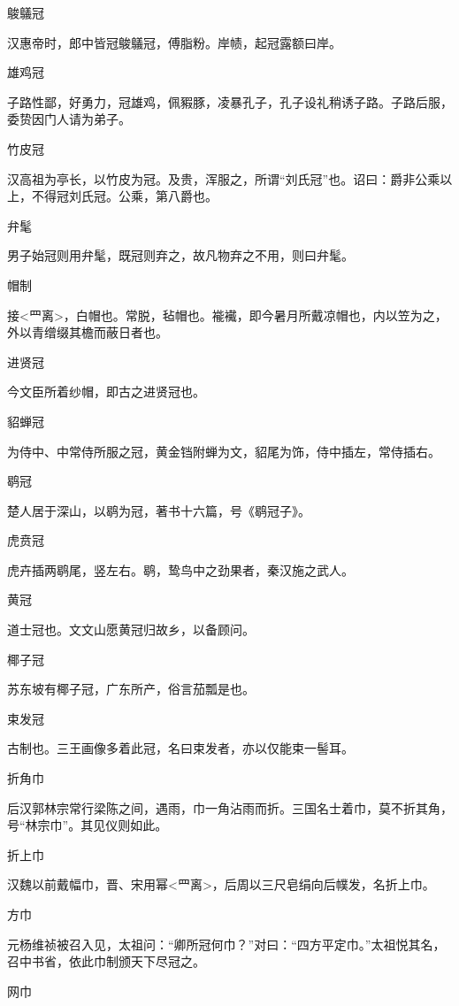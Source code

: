 \documentclass[a4paper,12pt,UTF8,twoside]{ctexbook}
\begin{document}
    鵔鸃冠
    
    汉惠帝时，郎中皆冠鵔鸃冠，傅脂粉。岸帻，起冠露额曰岸。
    
    雄鸡冠
    
    子路性鄙，好勇力，冠雄鸡，佩豭豚，凌暴孔子，孔子设礼稍诱子路。子路后服，委贽因门人请为弟子。
    
    竹皮冠
    
    汉高祖为亭长，以竹皮为冠。及贵，浑服之，所谓“刘氏冠”也。诏曰：爵非公乘以上，不得冠刘氏冠。公乘，第八爵也。
    
    弁髦
    
    男子始冠则用弁髦，既冠则弃之，故凡物弃之不用，则曰弁髦。
    
    帽制
    
    接<罒离>，白帽也。常脱，毡帽也。褦襶，即今暑月所戴凉帽也，内以笠为之，外以青缯缀其檐而蔽日者也。
    
    进贤冠
    
    今文臣所着纱帽，即古之进贤冠也。
    
    貂蝉冠
    
    为侍中、中常侍所服之冠，黄金铛附蝉为文，貂尾为饰，侍中插左，常侍插右。
    
    鹖冠
    
    楚人居于深山，以鹖为冠，著书十六篇，号《鹖冠子》。
    
    虎贲冠
    
    虎卉插两鹖尾，竖左右。鹖，鸷鸟中之劲果者，秦汉施之武人。
    
    黄冠
    
    道士冠也。文文山愿黄冠归故乡，以备顾问。
    
    椰子冠
    
    苏东坡有椰子冠，广东所产，俗言茄瓢是也。
    
    束发冠
    
    古制也。三王画像多着此冠，名曰束发者，亦以仅能束一髻耳。
    
    折角巾
    
    后汉郭林宗常行梁陈之间，遇雨，巾一角沾雨而折。三国名士着巾，莫不折其角，号“林宗巾”。其见仪则如此。
    
    折上巾
    
    汉魏以前戴幅巾，晋、宋用幂<罒离>，后周以三尺皂绢向后幞发，名折上巾。
    
    方巾
    
    元杨维祯被召入见，太祖问：“卿所冠何巾？”对曰：“四方平定巾。”太祖悦其名，召中书省，依此巾制颁天下尽冠之。
    
    网巾
    
\end{document}
